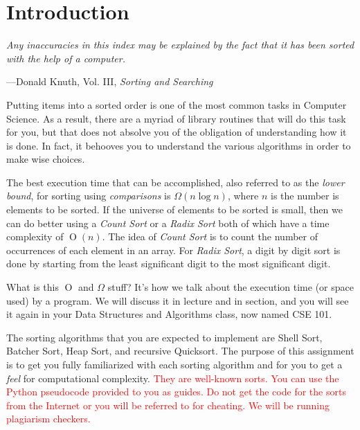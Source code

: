 \section{Introduction}

\textwidth
\epigraph{\emph{Any inaccuracies in this index may be explained by the
fact that it has been sorted with the help of a computer.}}{---Donald
Knuth, Vol.  III, \emph{Sorting and Searching}}

\noindent Putting items into a sorted order is one of the most common
tasks in Computer Science. As a result, there are a myriad of library
routines that will do this task for you, but that does not absolve you
of the obligation of understanding how it is done. In fact, it behooves
you to understand the various algorithms in order to make wise choices.

The best execution time that can be accomplished, also referred to as
the \emph{lower bound}, for sorting using \emph{comparisons} is
$\Omega(n \log n)$, where $n$ is the number is elements to be sorted. If
the universe of elements to be sorted is small, then we can do better
using a \emph{Count Sort} or a \emph{Radix Sort} both of which have a
time complexity of $\operatorname{O}(n)$. The idea of \emph{Count Sort}
is to count the number of occurrences of each element in an array. For
\emph{Radix Sort}, a digit by digit sort is done by starting from the
least significant digit to the most significant digit.

What is this $\operatorname{O}$ and $\Omega$ stuff? It's how we talk
about the execution time (or space used) by a program. We will discuss
it in lecture and in section, and you will see it again in your Data
Structures and Algorithms class, now named CSE 101.

The sorting algorithms that you are expected to implement are Shell Sort,
Batcher Sort, Heap Sort, and recursive Quicksort. The purpose of this assignment
is to get you fully familiarized with each sorting algorithm and for you to get
a \emph{feel} for computational complexity. \textcolor{red}{They are well-known
sorts. You can use the Python pseudocode provided to you as guides. Do not get
the code for the sorts from the Internet or you will be referred to for
cheating. We will be running plagiarism checkers.}
